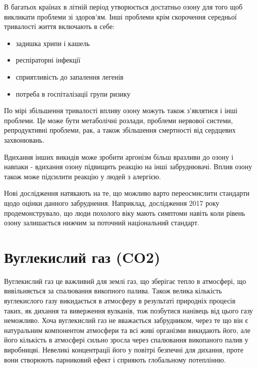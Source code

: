В багатьох країнах в літній період утворюється достатньо озону для того щоб викликати проблеми 
зі здоров'ям. Інші проблеми крім скорочення середньої тривалості життя включають в себе: 

\begin{itemize}
    \item задишка хрипи і кашель
    \item респіраторні інфекції
    \item сприятливість до запалення легенів
    \item потреба в госпіталізації групи ризику
\end{itemize}

По мірі збільшення тривалості впливу озону можуть також з'являтися і інші проблеми. Це може бути 
метаболічні розлади, проблеми нервової системи, репродуктивні проблеми, рак, а також збільшення 
смертності від сердцевих захвонювань. 

Вдихання інших викидів може зробити аргонізм більш вразливи до озону і навпаки - вдихання озону 
підвищить реакцію на інші забруднювачі. Вплив озону також може підсилити реакцію у людей з 
алергією.\cite{us_epa_ground-level_2015}

Нові дослідження натякають на те, що можливо варто переосмислити стандарти щодо оцінки данного
забруднення. Наприклад, дослідження 2017 року продемонструвало, що люди похолого віку мають 
симптоми навіть коли рівень озону залишається нижчим за поточний національний стандарт.


\section{Вуглекислий газ (CO2)}

Вуглекислий газ це важливий для землі газ, що зберігає тепло в атмосфері, що вивільняється за спалювання викопного палива. 
Також велика кількість вуглекислого газу викидається в атмосферу в результаті природніх процесів таких, як дихання та виверження вулканів, тож позбутися нанівець від цього газу неможливо. 
Хоча вуглекислий газ не вважається забрудником, через те що він є натуральним компонентом атмосфери та всі живі організми викидають його, але його кількість в атмосфері сильно зросла через спалювання викопаного палив у виробницві. 
Невеликі концентрації його у повітрі безпечні для дихання, проте вони створюють парниковий ефект і сприяють глобальному потеплінню.

